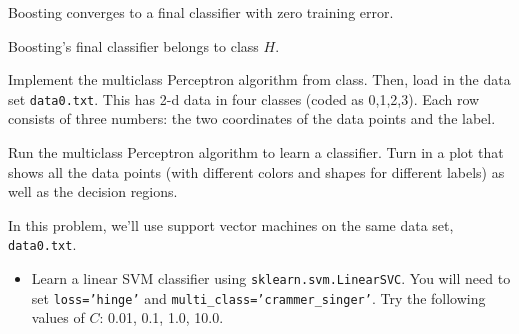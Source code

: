\documentclass{article}
\begin{document}
\begin{probset}
\begin{prob}
\begin{subprobset}
\begin{subprob}
        \begin{soln}

        \end{soln}
    \end{subprob}

    \begin{subprob}
        Boosting converges to a final classifier with zero training error.

        \begin{soln}

        \end{soln}
    \end{subprob}

    \begin{subprob}
        Boosting's final classifier belongs to class $H$.

        \begin{soln}

        \end{soln}
    \end{subprob}
    \end{subprobset}
\end{prob}

\begin{progprob}
    Implement the multiclass Perceptron algorithm from class. Then, load in the data set \texttt{data0.txt}. This has 2-d data in four classes (coded as 0,1,2,3). Each row consists of three numbers: the two coordinates of the data points and the label.

    Run the multiclass Perceptron algorithm to learn a classifier. Turn in a plot that shows all the data points (with different colors and shapes for different labels) as well as the decision regions.

    \begin{soln}

    \end{soln}
\end{progprob}

\begin{progprob}
    In this problem, we'll use support vector machines on the same data set, \texttt{data0.txt}.

    \begin{itemize}
        \item Learn a linear SVM classifier using \texttt{sklearn.svm.LinearSVC}. You will need to set \texttt{loss='hinge'} and \texttt{multi\_class='crammer\_singer'}. Try the following values of $C$: 0.01, 0.1, 1.0, 10.0.
    \end{itemize}


\end{progprob}
\end{probset}
\end{document}
